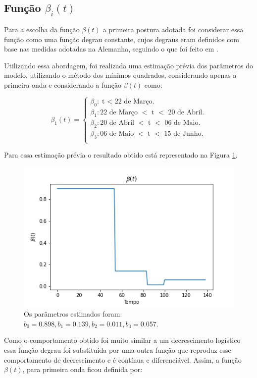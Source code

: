 \documentclass[12pt]{article}
\begin{document}
\subsection{Função $\beta_i(t)$}

Para a escolha da função $\beta(t)$ a primeira postura adotada foi considerar essa função como uma função degrau constante, cujos degraus eram definidos com base nas medidas adotadas na Alemanha, seguindo o que foi feito em \cite{goetz2020covid}.

Utilizando essa abordagem, foi realizada uma estimação prévia dos parâmetros do modelo, utilizando o método dos mínimos quadrados, considerando apenas a primeira onda e considerando a função $\beta(t)$ como: 

$$ \beta_1(t) =
\begin{cases}
\beta_0 : \text{t $<$ 22 de Março.} \\
\beta_1 : \text{22 de Março $<$ t $<$ 20 de Abril.}\\
\beta_2 : \text{20 de Abril $<$ t $<$ 06 de Maio.} \\
\beta_3 : \text{06 de Maio $<$ t $<$ 15 de Junho.} \\
\end{cases}$$


Para essa estimação prévia o resultado obtido está representado na Figura \ref{beta1teste}.
\begin{figure}[h!]
    \centering
    \includegraphics[scale = 0.6]{beta1_teste.png}
    \caption{Os parâmetros estimados foram: $b_0 = 0.898, b_1 = 0.139, b_2= 0.011, b_3 = 0.057.$}
    \label{beta1teste}
\end{figure}

Como o comportamento obtido foi muito similar a um decrescimento logístico essa função degrau foi substituída por uma outra função que reproduz esse comportamento de decrescimento e é contínua e diferenciável. Assim, a função $\beta(t)$, para primeira onda ficou definida por: 
\end{document}
